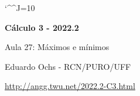 \documentclass[oneside,12pt]{article}
\begin{document}
\catcode`\^^J=10
\pu
\def\pictgridstyle{\color{GrayPale}\linethickness{0.3pt}}
\def\pictaxesstyle{\linethickness{0.5pt}}
\def\pictnaxesstyle{\color{GrayPale}\linethickness{0.5pt}}
\celllower=2.5pt


\def\u#1{\par{\footnotesize \url{#1}}}

\def\drafturl{http://angg.twu.net/LATEX/2022-2-C3.pdf}
\def\drafturl{http://angg.twu.net/2022.2-C3.html}
\def\draftfooter{\tiny \href{\drafturl}{\jobname{}} \ColorBrown{\shorttoday{} \hours}}

\def\ddt{\frac{d}{dt}}


%

\thispagestyle{empty}

\begin{center}

\vspace*{1.2cm}

{\bf \Large Cálculo 3 - 2022.2}

\bsk

Aula 27: Máximos e mínimos

\bsk

Eduardo Ochs - RCN/PURO/UFF

\url{http://angg.twu.net/2022.2-C3.html}

\end{center}

\newpage

\end{document}
